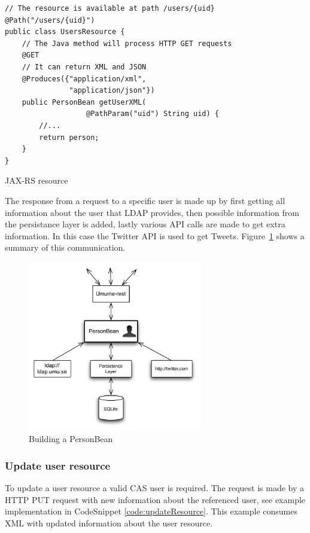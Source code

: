 \documentclass[titlepage, twocolumn, a4paper, 10pt]{article}
\begin{document}
\begin{code}
  \begin{footnotesize}
\begin{verbatim}
// The resource is available at path /users/{uid}
@Path("/users/{uid}")
public class UsersResource {
    // The Java method will process HTTP GET requests
    @GET
    // It can return XML and JSON
    @Produces({"application/xml",
               "application/json"})
    public PersonBean getUserXML(
                   @PathParam("uid") String uid) {
        //...
        return person;
    }
}
\end{verbatim}
  \end{footnotesize}
  \caption{JAX-RS resource}\label{code:jaxrs}
\end{code}

The response from a request to a specific user is made up by first
getting all information about the user that LDAP provides, then
possible information from the persistance layer is added, lastly
various API calls are made to get extra information. In this case the
Twitter API is used to get Tweets. Figure~\ref{fig:images/personbean}
shows a summary of this communication.

\begin{figure}[!htb]
  \centering
  \includegraphics[width=3in]{images/personbean.pdf}
  \caption{Building a PersonBean}
  \label{fig:images/personbean}
\end{figure}


\subsubsection{Update user resource}\label{sec:updateuser}
To update a user resource a valid CAS user is required. The request is
made by a HTTP PUT request with new information about the referenced
user, see example implementation in CodeSnippet
\ref{code:updateResource}. This example consumes XML with updated
information about the user resource.
\end{document}
